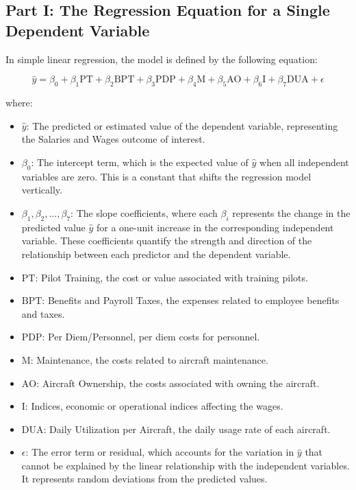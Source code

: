 \subsection{Part I: The Regression Equation for a Single Dependent Variable}

In simple linear regression, the model is defined by the following equation:

\begin{equation}
    \hat{y} = \beta_0 + \beta_1 \text{PT} + \beta_2 \text{BPT} + \beta_3 \text{PDP} + \beta_4 \text{M} + \beta_5 \text{AO} + \beta_6 \text{I} + \beta_7 \text{DUA} + \epsilon
\end{equation}

where:
\begin{itemize}
    \item \(\hat{y}\): The predicted or estimated value of the dependent variable, representing the Salaries and Wages outcome of interest.
    \item \(\beta_0\): The intercept term, which is the expected value of \(\hat{y}\) when all independent variables are zero. This is a constant that shifts the regression model vertically.
    \item \(\beta_1, \beta_2, \dots, \beta_7\): The slope coefficients, where each \(\beta_i\) represents the change in the predicted value \(\hat{y}\) for a one-unit increase in the corresponding independent variable. These coefficients quantify the strength and direction of the relationship between each predictor and the dependent variable.
    \item \(\text{PT}\): Pilot Training, the cost or value associated with training pilots.
    \item \(\text{BPT}\): Benefits and Payroll Taxes, the expenses related to employee benefits and taxes.
    \item \(\text{PDP}\): Per Diem/Personnel, per diem costs for personnel.
    \item \(\text{M}\): Maintenance, the costs related to aircraft maintenance.
    \item \(\text{AO}\): Aircraft Ownership, the costs associated with owning the aircraft.
    \item \(\text{I}\): Indices, economic or operational indices affecting the wages.
    \item \(\text{DUA}\): Daily Utilization per Aircraft, the daily usage rate of each aircraft.
    \item \(\epsilon\): The error term or residual, which accounts for the variation in \(\hat{y}\) that cannot be explained by the linear relationship with the independent variables. It represents random deviations from the predicted values.
\end{itemize}
